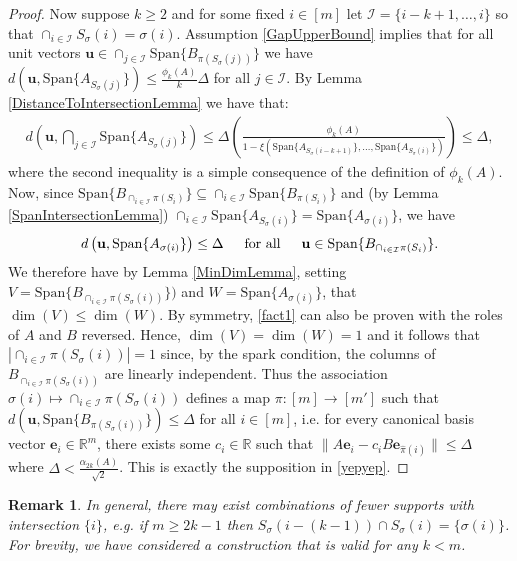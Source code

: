 \documentclass[journal, onecolumn]{IEEEtran}
\newtheorem{remark}{Remark}
\begin{document}
\begin{proof}
Now suppose $k \geq 2$ and for some fixed $i \in [m]$ let $\mathcal{I} = \{i-k+1, \ldots, i\}$ so that $\cap_{i \in \mathcal{I}} S_\sigma(i) = \sigma(i)$. Assumption \eqref{GapUpperBound} implies that for all unit vectors $\mathbf{u} \in \cap_{j \in \mathcal{I}} \text{Span}\{B_{\pi(S_\sigma(j))}\}$ we have $d(\mathbf{u}, \text{Span}\{A_{S_\sigma(j)}\}) \leq \frac{\phi_k(A)}{k} \Delta$ for all $j \in \mathcal{I}$. By Lemma \ref{DistanceToIntersectionLemma} we have that:
\begin{align}\label{sym2}
d\left( \mathbf{u}, \bigcap_{j \in \mathcal{I}} \text{Span}\{A_{S_{\sigma}(j)}\} \right) 
\leq \Delta \left( \frac{\phi_k(A)}{1 - \xi(\text{Span}\{A_{S_{\sigma}(i-k+1)}\}, \ldots, \text{Span}\{A_{S_\sigma(i)}\})} \right) \leq \Delta,
\end{align}
%
where the second inequality is a simple consequence of the definition of $\phi_k(A)$. Now, since $\text{Span}\{B_{\cap_{i \in \mathcal{I}}\pi(S_i)}\} \subseteq \cap_{i \in \mathcal{I}} \text{Span}\{B_{\pi(S_i)}\}$ and (by Lemma \ref{SpanIntersectionLemma}) $\cap_{i \in \mathcal{I}}  \text{Span}\{A_{S_\sigma(i)}\} = \text{Span}\{A_{\sigma(i)}\}$, we have
\begin{align}\label{fact1}
d\left( \mathbf{u}, \text{Span}\{A_{\sigma(i)}\} \right) \leq \Delta \indent \text{for all} \indent \mathbf{u} \in \text{Span}\{B_{\cap_{i \in \mathcal{I}}\pi(S_i)}\}.
\end{align}
We therefore have by Lemma \ref{MinDimLemma}, setting $V = \text{Span}\{B_{\cap_{i \in \mathcal{I}}\pi(S_\sigma(i))}\})$ and $W = \text{Span}\{A_{\sigma(i)}\}$, that $\dim(V) \leq \dim(W)$. By symmetry, \eqref{fact1} can also be proven with the roles of $A$ and $B$ reversed. Hence, $\dim(V) = \dim(W) = 1$ and it follows that $|\cap_{i \in \mathcal{I}} \pi(S_\sigma(i))| = 1$ since, by the spark condition, the columns of $B_{\cap_{i \in \mathcal{I}} \pi(S_\sigma(i))}$ are linearly independent. Thus the association $\sigma(i) \mapsto \cap_{i \in \mathcal{I}} \pi(S_\sigma(i))$ defines a map $\pi: [m] \to [m']$ such that $d\left( \mathbf{u}, \text{Span}\{B_{ \pi(S_\sigma(i))}\}\right) \leq \Delta$ for all $i \in [m]$, i.e. for every canonical basis vector $\mathbf{e}_i \in \mathbb{R}^m$, there exists some $c_i \in \mathbb{R}$ such that $\|A\mathbf{e}_i - c_iB\mathbf{e}_{\hat \pi(i)}\| \leq \Delta$ where $\Delta < \frac{\alpha_{2k}(A)}{\sqrt{2}}$. This is exactly the supposition in \eqref{yepyep}.
\end{proof}

\begin{remark} In general, there may exist combinations of fewer supports with intersection $\{i\}$, e.g. if $m \geq 2k-1$ then $S_\sigma(i - (k-1)) \cap S_\sigma(i) = \{\sigma(i)\}$. For brevity, we have considered a construction that is valid for any $k < m$.
\end{remark}
\end{document}
